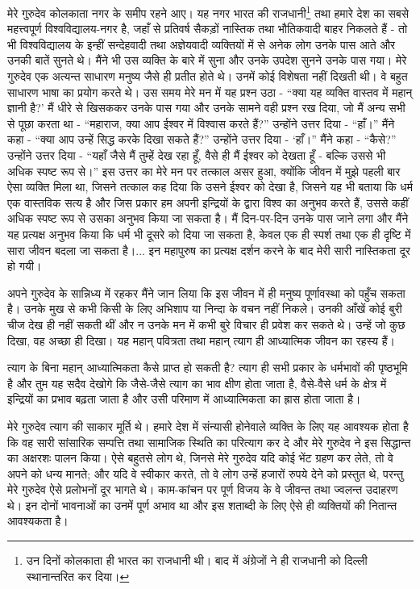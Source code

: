मेरे गुरुदेव कोलकाता नगर के समीप रहने आए। यह नगर भारत की राजधानी\footnote{ उन दिनों कोलकाता ही भारत का राजधानी थी। बाद में अंग्रेजों ने ही राजधानी को दिल्ली स्थानान्तरित कर दिया।} तथा हमारे देश का सबसे महत्त्वपूर्ण विश्वविद्यालय-नगर है, जहाँ से प्रतिवर्ष सैकड़ों नास्तिक तथा भौतिकवादी बाहर निकलते हैं - तो भी विश्वविद्यालय के इन्हीं सन्देहवादी तथा अज्ञेयवादी व्यक्तियों में से अनेक लोग उनके पास आते और उनकी बातें सुनते थे। मैंने भी उस व्यक्ति के बारे में सुना और उनके उपदेश सुनने उनके पास गया। मेरे गुरुदेव एक अत्यन्त साधारण मनुष्य जैसे ही प्रतीत होते थे। उनमें कोई विशेषता नहीं दिखती थी। वे बहुत साधारण भाषा का प्रयोग करते थे। उस समय मेरे मन में यह प्रश्न उठा - “क्या यह व्यक्ति वास्तव में महान् ज्ञानी है?’ मैं धीरे से खिसककर उनके पास गया और उनके सामने वही प्रश्न रख दिया, जो मैं अन्य सभी से पूछा करता था - “महाराज, क्या आप ईश्वर में विश्वास करते हैं?” उन्होंने उत्तर दिया - “हाँ।” मैंने कहा - “क्या आप उन्हें सिद्ध करके दिखा सकते हैं?” उन्होंने उत्तर दिया - ‘हाँ।” मैंने कहा - “कैसे?” उन्होंने उत्तर दिया - “यहाँ जैसे मैं तुम्हें देख रहा हूँ, वैसे ही मैं ईश्वर को देखता हूँ - बल्कि उससे भी अधिक स्पष्ट रूप से।” इस उत्तर का मेरे मन पर तत्काल असर हुआ, क्योंकि जीवन में मुझे पहली बार ऐसा व्यक्ति मिला था, जिसने तत्काल कह दिया कि उसने ईश्वर को देखा है, जिसने यह भी बताया कि धर्म एक वास्तविक सत्य है और जिस प्रकार हम अपनी इन्द्रियों के द्वारा विश्व का अनुभव करते हैं, उससे कहीं अधिक स्पष्ट रूप से उसका अनुभव किया जा सकता है। मैं दिन-पर-दिन उनके पास जाने लगा और मैंने यह प्रत्यक्ष अनुभव किया कि धर्म भी दूसरे को दिया जा सकता है, केवल एक ही स्पर्श तथा एक ही दृष्टि में सारा जीवन बदला जा सकता है।... इन महापुरुष का प्रत्यक्ष दर्शन करने के बाद मेरी सारी नास्तिकता दूर हो गयी। 

अपने गुरुदेव के सान्निध्य में रहकर मैंने जान लिया कि इस जीवन में ही मनुष्य पूर्णावस्था को पहुँच सकता है। उनके मुख से कभी किसी के लिए अभिशाप या निन्दा के वचन नहीं निकले। उनकी आँखें कोई बुरी चीज देख ही नहीं सकती थीं और न उनके मन में कभी बुरे विचार ही प्रवेश कर सकते थे। उन्हें जो कुछ दिखा, वह अच्छा ही दिखा। यह महान् पवित्रता तथा महान् त्याग ही आध्यात्मिक जीवन का रहस्य हैं। 

त्याग के बिना महान् आध्यात्मिकता कैसे प्राप्त हो सकती है? त्याग ही सभी प्रकार के धर्मभावों की पृष्ठभूमि है और तुम यह सदैव देखोगे कि जैसे-जैसे त्याग का भाव क्षीण होता जाता है, वैसे-वैसे धर्म के क्षेत्र में इन्द्रियों का प्रभाव बढ़ता जाता है और उसी परिमाण में आध्यात्मिकता का ह्रास होता जाता है। 

मेरे गुरुदेव त्याग की साकार मूर्ति थे। हमारे देश में संन्यासी होनेवाले व्यक्ति के लिए यह आवश्यक होता है कि वह सारी सांसारिक सम्पत्ति तथा सामाजिक स्थिति का परित्याग कर दे और मेरे गुरुदेव ने इस सिद्धान्त का अक्षरशः पालन किया। ऐसे बहुतसे लोग थे, जिनसे मेरे गुरुदेव यदि कोई भेंट ग्रहण कर लेते, तो वे अपने को धन्य मानते; और यदि वे स्वीकार करते, तो वे लोग उन्हें हजारों रुपये देने को प्रस्तुत थे, परन्तु मेरे गुरुदेव ऐसे प्रलोभनों दूर भागते थे। काम-कांचन पर पूर्ण विजय के वे जीवन्त तथा ज्वलन्त उदाहरण थे। इन दोनों भावनाओं का उनमें पूर्ण अभाव था और इस शताब्दी के लिए ऐसे ही व्यक्तियों की नितान्त आवश्यकता है। 

